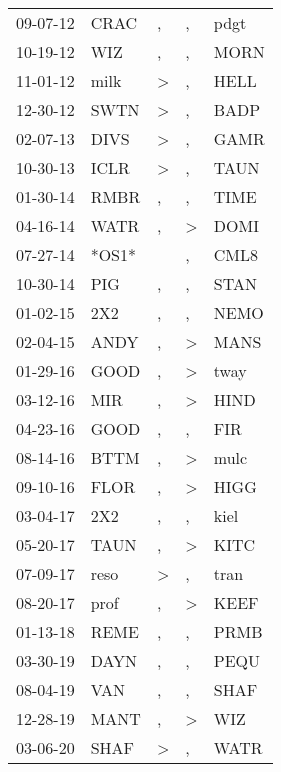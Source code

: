 \begin{supertabular}{lllll}
 09-07-12 &   CRAC &                , &                , &   pdgt \\
 10-19-12 &    WIZ &                , &                , &   MORN \\
 11-01-12 &   milk &     \textgreater &                , &   HELL \\
 12-30-12 &   SWTN &     \textgreater &                , &   BADP \\
 02-07-13 &   DIVS &     \textgreater &                , &   GAMR \\
 10-30-13 &   ICLR &     \textgreater &                , &   TAUN \\
 01-30-14 &   RMBR &                , &                , &   TIME \\
 04-16-14 &   WATR &                , &     \textgreater &   DOMI \\
 07-27-14 &  *OS1* &                  &                , &   CML8 \\
 10-30-14 &    PIG &                , &                , &   STAN \\
 01-02-15 &    2X2 &                , &                , &   NEMO \\
 02-04-15 &   ANDY &                , &     \textgreater &   MANS \\
 01-29-16 &   GOOD &                , &     \textgreater &   tway \\
 03-12-16 &    MIR &                , &     \textgreater &   HIND \\
 04-23-16 &   GOOD &                , &                , &    FIR \\
 08-14-16 &   BTTM &                , &     \textgreater &   mulc \\
 09-10-16 &   FLOR &                , &     \textgreater &   HIGG \\
 03-04-17 &    2X2 &                , &                , &   kiel \\
 05-20-17 &   TAUN &                , &     \textgreater &   KITC \\
 07-09-17 &   reso &     \textgreater &                , &   tran \\
 08-20-17 &   prof &                , &     \textgreater &   KEEF \\
 01-13-18 &   REME &                , &                , &   PRMB \\
 03-30-19 &   DAYN &                , &                , &   PEQU \\
 08-04-19 &    VAN &                , &                , &   SHAF \\
 12-28-19 &   MANT &                , &     \textgreater &    WIZ \\
 03-06-20 &   SHAF &     \textgreater &                , &   WATR \\
\end{supertabular}
